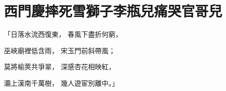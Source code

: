 %

\chapter{西門慶摔死雪獅子\KG 李瓶兒痛哭官哥兒}


\begin{showcontents}{}




「日落水流西復東，  春風下盡折何窮，

巫峽廟裡低含雨，  宋玉門前斜帶風；

莫將榆莢共爭翠，  深感杏花相映紅，

灞上漢南千萬樹，  幾人遊宦別離中。」


\end{showcontents}
